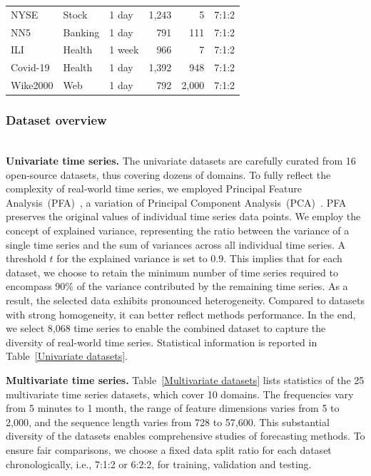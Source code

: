 \documentclass[sigconf, nonacm, pdfa]{acmart}
\begin{document}
\begin{table}[t]
\begin{tabular}{@{}lllrrc@{}}
NYSE         & Stock       & 1 day     & 1,243       & 5        & 7:1:2 \\
NN5         & Banking     & 1 day     & 791        & 111      & 7:1:2 \\
ILI          & Health      & 1 week     & 966        & 7        & 7:1:2 \\
Covid-19     & Health      & 1 day     & 1,392       & 948      & 7:1:2 \\ 
Wike2000     & Web         & 1 day     & 792        & 2,000     & 7:1:2  \\ \bottomrule
\end{tabular}
\end{table}
\renewcommand{\arraystretch}{1}


\subsubsection{Dataset overview} 
\label{sec:Datasets introduction}

\noindent
\\\textbf{Univariate time series.} The univariate datasets are carefully curated from 16 open-source datasets, thus covering dozens of domains.
To fully reflect the complexity of real-world time series, we employed Principal Feature Analysis~(PFA)~\cite{lu2007feature}, a variation of Principal Component Analysis~(PCA)~\cite{bro2014principal}. %
PFA preserves the original values of individual time series data points. We employ the concept of explained variance, representing the ratio between the variance of a single time series and the sum of variances across all individual time series. A threshold $t$ for the explained variance is set to 0.9. This implies that for each dataset, we choose to retain the minimum number of time series required to encompass 90\% of the variance contributed by the remaining time series. As a result, the selected data exhibits pronounced heterogeneity. Compared to datasets with strong homogeneity, it can better reflect methods performance. 
In the end, we select 8,068 time series to enable the combined dataset to capture the diversity of real-world time series. Statistical information is reported in Table~\ref{Univariate datasets}. 

\noindent
\textbf{Multivariate time series. } 
Table~\ref{Multivariate datasets} lists statistics of the 25 multivariate time series datasets, which cover 10 domains. The frequencies vary from 5 minutes to 1 month, the range of feature dimensions varies from 5 to 2,000, and the sequence length varies from 728 to 57,600. This substantial diversity of the datasets enables comprehensive studies of forecasting methods. To ensure fair comparisons, we choose a fixed data split ratio for each dataset chronologically, i.e., 7:1:2 or 6:2:2, for training, validation and testing. 
\end{document}
